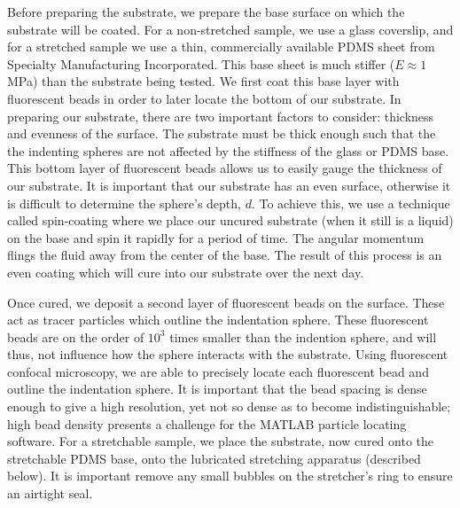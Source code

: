 Before preparing the substrate, we prepare the base surface on which the substrate will be coated. For a non-stretched sample, we use a glass coverslip, and for a stretched sample we use a thin, commercially available PDMS sheet from Specialty Manufacturing Incorporated. This base sheet is much stiffer ($ E\approx 1 $ MPa) than the substrate being tested. We first coat this base layer with fluorescent beads in order to later locate the bottom of our substrate. In preparing our substrate, there are two important factors to consider: thickness and evenness of the surface. The substrate must be thick enough such that the the indenting spheres are not affected by the stiffness of the glass or PDMS base. This bottom layer of fluorescent beads allows us to easily gauge the thickness of our substrate. It is important that our substrate has an even surface, otherwise it is difficult to determine the sphere's depth, $ d $. To achieve this, we use a technique called spin-coating where we place our uncured substrate (when it still is a liquid) on the base and spin it rapidly for a period of time. The angular momentum  flings the fluid away from the center of the base. The result of this process is an even coating which will cure into our substrate over the next day.

Once cured, we deposit a second layer of fluorescent beads on the surface. These act as tracer particles which outline the indentation sphere. These fluorescent beads are on the order of $ 10^3 $ times smaller than the indention sphere, and will thus, not influence how the sphere interacts with the substrate. Using fluorescent confocal microscopy, we are able to precisely locate each fluorescent bead and outline the indentation sphere. It is important that the bead spacing is dense enough to give a high resolution, yet not so dense as to become indistinguishable; high bead density presents a challenge for the MATLAB particle locating software. For a stretchable sample, we place the substrate, now cured onto the stretchable PDMS base, onto the lubricated stretching apparatus (described below). It is important remove any small bubbles on the stretcher's ring to ensure an airtight seal. 

